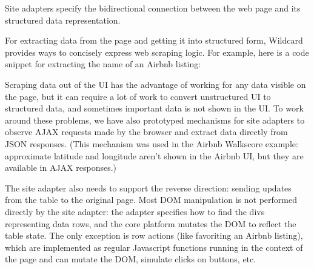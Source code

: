 \documentclass[english,submission]{programming}
\newenvironment{Shaded}{}{}
\newcommand{\CommentTok}[1]{\textcolor[rgb]{0.38,0.63,0.69}{\textit{#1}}}
\newcommand{\FunctionTok}[1]{\textcolor[rgb]{0.02,0.16,0.49}{#1}}
\newcommand{\KeywordTok}[1]{\textcolor[rgb]{0.00,0.44,0.13}{\textbf{#1}}}
\newcommand{\NormalTok}[1]{#1}
\newcommand{\OperatorTok}[1]{\textcolor[rgb]{0.40,0.40,0.40}{#1}}
\newcommand{\SpecialCharTok}[1]{\textcolor[rgb]{0.25,0.44,0.63}{#1}}
\newcommand{\StringTok}[1]{\textcolor[rgb]{0.25,0.44,0.63}{#1}}
\newcommand{\VariableTok}[1]{\textcolor[rgb]{0.10,0.09,0.49}{#1}}
\newcommand{\VerbatimStringTok}[1]{\textcolor[rgb]{0.25,0.44,0.63}{#1}}
\begin{document}
Site adapters specify the bidirectional connection between the web page
and its structured data representation.

For extracting data from the page and getting it into structured form,
Wildcard provides ways to concisely express web scraping logic. For
example, here is a code snippet for extracting the name of an Airbnb
listing:

\begin{Shaded}
\end{Shaded}

Scraping data out of the UI has the advantage of working for any data
visible on the page, but it can require a lot of work to convert
unstructured UI to structured data, and sometimes important data is not
shown in the UI. To work around these problems, we have also prototyped
mechanisms for site adapters to observe AJAX requests made by the
browser and extract data directly from JSON responses. (This mechanism
was used in the Airbnb Walkscore example: approximate latitude and
longitude aren't shown in the Airbnb UI, but they are available in AJAX
responses.)

The site adapter also needs to support the reverse direction: sending
updates from the table to the original page. Most DOM manipulation is
not performed directly by the site adapter: the adapter specifies how to
find the divs representing data rows, and the core platform mutates the
DOM to reflect the table state. The only exception is row actions (like
favoriting an Airbnb listing), which are implemented as regular
Javascript functions running in the context of the page and can mutate
the DOM, simulate clicks on buttons, etc.
\end{document}
